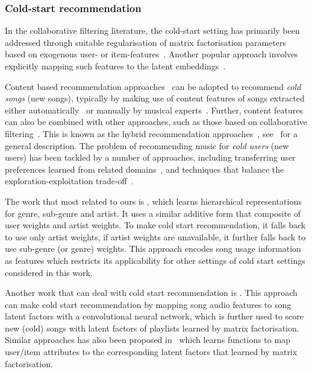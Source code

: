 \subsubsection{Cold-start recommendation}
In the collaborative filtering literature,
the cold-start setting has primarily been addressed through
suitable regularisation of matrix factorisation parameters
based on exogenous user- or item-features~\cite{Ma:2008,Agarwal:2009,Cao:2010}.
Another popular approach involves explicitly mapping such features to the latent embeddings~\cite{Gantner:2010}.

Content based recommendation approaches~\cite[Chapter~4]{aggarwal2016recommender}
can be adopted to recommend {\it cold songs} (\ie new songs),
typically by making use of content features of songs extracted either automatically~\cite{seyerlehner2010automatic,eghbal2015vectors}
or manually by musical experts~\cite{john2006pandora}.
Further, content features can also be combined with other approaches, such as those based on 
collaborative filtering~\cite{yoshii2006hybrid,donaldson2007hybrid,shao2009music}.
This is known as the hybrid recommendation approaches~\cite{burke2002hybrid}, 
see~\cite[Chapter~6]{aggarwal2016recommender} for a general description. %
The problem of recommending music for {\it cold users} (\ie new users) 
has been tackled by a number of approaches, including transferring user preferences learned 
from related domains~\cite{hu2010study,aizenberg2012build},
and techniques that balance the exploration-exploitation trade-off~\cite{wang2014exploration,liebman2015dj}.


The work that most related to ours is \citep{ben2017groove}, which learns hierarchical representations
for genre, sub-genre and artist.
It uses a similar additive form that composite of user weights and artist weights.
To make cold start recommendation, it falls back to use only artist weights,
if artist weights are unavailable, it further falls back to use sub-genre (or genre) weights.
This approach encodes song usage information as features which restricts its applicability for other settings
of cold start settings considered in this work.

Another work that can deal with cold start recommendation is \citep{van2013deep}.
This approach can make cold start recommendation by mapping song audio features to song latent factors 
with a convolutional neural network, which is further used to score new (cold) songs with 
latent factors of playlists learned by matrix factorisation.
Similar approaches has also been proposed in~\cite{gantner2010learning} which learns functions to map
user/item attributes to the corresponding latent factors that learned by matrix factorisation.





